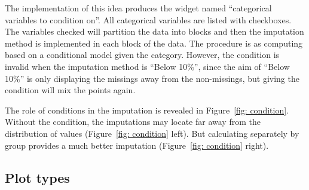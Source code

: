 \documentclass[article]{jss}
\begin{document}
The implementation of this idea produces the widget named ``categorical variables to condition on''. All categorical variables are listed with checkboxes. The variables checked will partition the data into blocks and then the imputation method is implemented in each block of the data. The procedure is as computing based on a conditional model given the category. However, the condition is invalid when the imputation method is ``Below 10\%'', since the aim of ``Below 10\%'' is only displaying the missings away from the non-missings, but giving the condition will mix the points again.

The role of conditions in the imputation is revealed in Figure~\ref{fig: condition}. Without the condition, the imputations may locate far away from the distribution of values (Figure~\ref{fig: condition} left). But calculating separately by group provides a much better imputation (Figure~\ref{fig: condition} right).

\subsection{Plot types}
\end{document}
